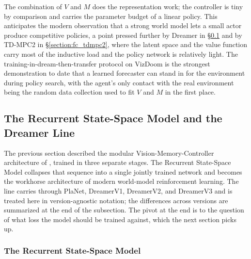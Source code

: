 The combination of $V$ and $M$ does the representation work; the controller is tiny by comparison and carries the parameter budget of a linear policy. This anticipates the modern observation that a strong world model lets a small actor produce competitive policies, a point pressed further by Dreamer in \S\ref{section:fc_rssm} and by TD-MPC2 in \S\ref{section:fc_tdmpc2}, where the latent space and the value function carry most of the inductive load and the policy network is relatively light. The training-in-dream-then-transfer protocol on VizDoom is the strongest demonstration to date that a learned forecaster can stand in for the environment during policy search, with the agent's only contact with the real environment being the random data collection used to fit $V$ and $M$ in the first place.

\subsection{The Recurrent State-Space Model and the Dreamer Line}
\label{section:fc_rssm}

The previous section described the modular Vision-Memory-Controller architecture of \citet{HaSchmidhuber2018}, trained in three separate stages. The Recurrent State-Space Model collapses that sequence into a single jointly trained network and becomes the workhorse architecture of modern world-model reinforcement learning. The line carries through PlaNet, DreamerV1, DreamerV2, and DreamerV3 and is treated here in version-agnostic notation; the differences across versions are summarized at the end of the subsection. The pivot at the end is to the question of what loss the model should be trained against, which the next section picks up.

\subsubsection{The Recurrent State-Space Model}
\label{section:fc_rssm_transition}

